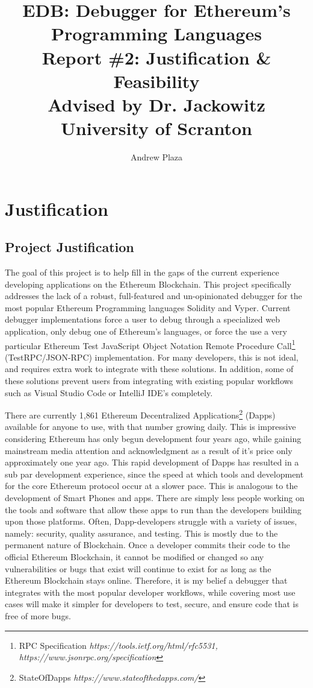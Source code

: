 \documentclass[]{report}
\title{%
	EDB: Debugger for Ethereum's Programming Languages \\
	\medskip
	\large Report \#2: Justification \& Feasibility \\
	\large Advised by Dr. Jackowitz	\\
	\large University of Scranton}
\author{Andrew Plaza}
\begin{document}
\maketitle
\tableofcontents
\newpage

\section {Justification}
\subsection{Project Justification}
The goal of this project is to help fill in the gaps of the current experience developing applications on the Ethereum Blockchain. This project specifically addresses the lack of a robust, full-featured and un-opinionated debugger for the most popular Ethereum Programming languages Solidity and Vyper. Current debugger implementations force a user to debug through a specialized web application, only debug one of Ethereum's languages, or force the use a very particular Ethereum Test JavaScript Object Notation Remote Procedure Call\footnote{RPC Specification \textit{https://tools.ietf.org/html/rfc5531, https://www.jsonrpc.org/specification}} (TestRPC/JSON-RPC) implementation. For many developers, this is not ideal, and requires extra work to integrate with these solutions. In addition, some of these solutions prevent users from integrating with existing popular workflows such as Visual Studio Code or IntelliJ IDE's completely.


There are currently 1,861 Ethereum Decentralized Applications\footnote{StateOfDapps \textit {https://www.stateofthedapps.com/}} (Dapps) available for anyone to use, with that number growing daily. This is impressive considering Ethereum has only begun development four years ago, while gaining mainstream media attention and acknowledgment as a result of it's price only approximately one year ago. This rapid development of Dapps has resulted in a sub par development experience, since the speed at which tools and development for the core Ethereum protocol occur at a slower pace. This is analogous to the development of Smart Phones and apps. There are simply less people working on the tools and software that allow these apps to run than the developers building upon those platforms. Often, Dapp-developers struggle with a variety of issues, namely: security, quality assurance, and testing. This is mostly due to the permanent nature of Blockchain. Once a developer commits their code to the official Ethereum Blockchain, it cannot be modified or changed so any vulnerabilities or bugs that exist will continue to exist for as long as the Ethereum Blockchain stays online. Therefore, it is my belief a debugger that integrates with the most popular developer workflows, while covering most use cases will make it simpler for developers to test, secure, and ensure code that is free of more bugs.
\end{document}
